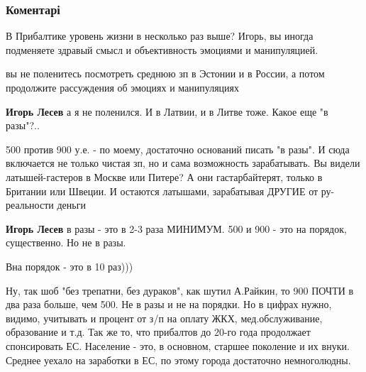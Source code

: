  
 
 
 
 
\subsubsection{Коментарі}

\begin{itemize} %
В Прибалтике уровень жизни в несколько раз выше? Игорь, вы иногда подменяете здравый смысл и объективность эмоциями и манипуляцией.

\begin{itemize} %
вы не поленитесь посмотреть среднюю зп в Эстонии и в России, а потом продолжите рассуждения об эмоциях и манипуляциях

\textbf{Игорь Лесев} а я не поленился. И в Латвии, и в Литве тоже. Какое еще "в разы"?..


500 против 900 у.е. - по моему, достаточно оснований писать "в разы". И сюда
включается не только чистая зп, но и сама возможность зарабатывать. Вы видели
латышей-гастеров в Москве или Питере? А они гастарбайтерят, только в Британии
или Швеции. И остаются латышами, зарабатывая ДРУГИЕ от ру-реальности деньги


\textbf{Игорь Лесев} в разы - это в 2-3 раза МИНИМУМ.
500 и 900 - это на порядок, существенно.
Но не в разы.

Вна порядок - это в 10 раз)))


Ну, так шоб "без трепатни, без дураков", как шутил А.Райкин, то 900 ПОЧТИ в два
раза больше, чем 500. Не в разы и не на порядки. Но в цифрах нужно, видимо,
учитывать и процент от з/п на оплату ЖКХ, мед.обслуживание, образование и т.д.
Так же то, что прибалтов до 20-го года продолжает спонсировать ЕС. Население -
это, в основном, старшее поколение и их внуки. Среднее уехало на заработки в
ЕС, по этому города достаточно немноголюдны.

\end{itemize} %


\end{itemize}
